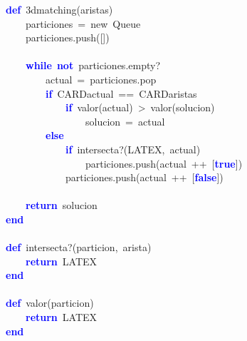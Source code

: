 \noindent
\mbox{}\textbf{\textcolor{Blue}{def}}\ 3dmatching\textcolor{BrickRed}{(}aristas\textcolor{BrickRed}{)} \\
\mbox{}\ \ \ \ particiones\ \textcolor{BrickRed}{=}\ new\ Queue \\
\mbox{}\ \ \ \ particiones\textcolor{BrickRed}{.}push\textcolor{BrickRed}{([])} \\
\mbox{} \\
\mbox{}\ \ \ \ \textbf{\textcolor{Blue}{while}}\ \textbf{\textcolor{Blue}{not}}\ particiones\textcolor{BrickRed}{.}empty? \\
\mbox{}\ \ \ \ \ \ \ \ actual\ \textcolor{BrickRed}{=}\ particiones\textcolor{BrickRed}{.}pop \\
\mbox{}\ \ \ \ \ \ \ \ \textbf{\textcolor{Blue}{if}}\ CARDactual\ \textcolor{BrickRed}{==}\ CARDaristas \\
\mbox{}\ \ \ \ \ \ \ \ \ \ \ \ \textbf{\textcolor{Blue}{if}}\ valor\textcolor{BrickRed}{(}actual\textcolor{BrickRed}{)}\ \textcolor{BrickRed}{\textgreater{}}\ valor\textcolor{BrickRed}{(}solucion\textcolor{BrickRed}{)} \\
\mbox{}\ \ \ \ \ \ \ \ \ \ \ \ \ \ \ \ solucion\ \textcolor{BrickRed}{=}\ actual \\
\mbox{}\ \ \ \ \ \ \ \ \textbf{\textcolor{Blue}{else}} \\
\mbox{}\ \ \ \ \ \ \ \ \ \ \ \ \textbf{\textcolor{Blue}{if}}\ intersecta?\textcolor{BrickRed}{(}LATEX\textcolor{BrickRed}{,}\ actual\textcolor{BrickRed}{)} \\
\mbox{}\ \ \ \ \ \ \ \ \ \ \ \ \ \ \ \ particiones\textcolor{BrickRed}{.}push\textcolor{BrickRed}{(}actual\ \textcolor{BrickRed}{++}\ \textcolor{BrickRed}{[}\textbf{\textcolor{Blue}{true}}\textcolor{BrickRed}{])} \\
\mbox{}\ \ \ \ \ \ \ \ \ \ \ \ particiones\textcolor{BrickRed}{.}push\textcolor{BrickRed}{(}actual\ \textcolor{BrickRed}{++}\ \textcolor{BrickRed}{[}\textbf{\textcolor{Blue}{false}}\textcolor{BrickRed}{])} \\
\mbox{} \\
\mbox{}\ \ \ \ \textbf{\textcolor{Blue}{return}}\ solucion \\
\mbox{}\textbf{\textcolor{Blue}{end}} \\
\mbox{} \\
\mbox{}\textbf{\textcolor{Blue}{def}}\ intersecta?\textcolor{BrickRed}{(}particion\textcolor{BrickRed}{,}\ arista\textcolor{BrickRed}{)} \\
\mbox{}\ \ \ \ \textbf{\textcolor{Blue}{return}}\ LATEX \\
\mbox{}\textbf{\textcolor{Blue}{end}} \\
\mbox{} \\
\mbox{}\textbf{\textcolor{Blue}{def}}\ valor\textcolor{BrickRed}{(}particion\textcolor{BrickRed}{)} \\
\mbox{}\ \ \ \ \textbf{\textcolor{Blue}{return}}\ LATEX \\
\mbox{}\textbf{\textcolor{Blue}{end}} \\
\mbox{}
